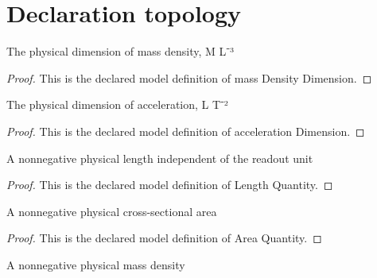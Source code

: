 \section{Declaration topology}
\begin{definition}
  \label{def:physics:phyx-mini-0663:phyxminiproblems-problemphyxmini0663-massdensitydimension}
  The physical dimension of mass density, M L⁻³
\end{definition}
\begin{proof}
  This is the declared model definition of mass Density Dimension.
\end{proof}
\begin{definition}
  \label{def:physics:phyx-mini-0663:phyxminiproblems-problemphyxmini0663-accelerationdimension}
  The physical dimension of acceleration, L T⁻²
\end{definition}
\begin{proof}
  This is the declared model definition of acceleration Dimension.
\end{proof}
\begin{definition}
  \label{def:physics:phyx-mini-0663:phyxminiproblems-problemphyxmini0663-lengthquantity}
  A nonnegative physical length independent of the readout unit
\end{definition}
\begin{proof}
  This is the declared model definition of Length Quantity.
\end{proof}
\begin{definition}
  \label{def:physics:phyx-mini-0663:phyxminiproblems-problemphyxmini0663-areaquantity}
  A nonnegative physical cross-sectional area
\end{definition}
\begin{proof}
  This is the declared model definition of Area Quantity.
\end{proof}
\begin{definition}
  \label{def:physics:phyx-mini-0663:phyxminiproblems-problemphyxmini0663-massdensityquantity}
  A nonnegative physical mass density
\end{definition}
